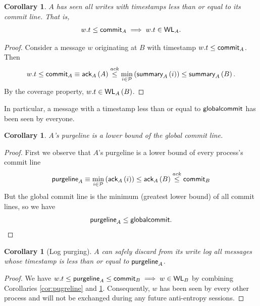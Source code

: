 \documentclass[]             %
{NASA}                       %
\newtheorem{corollary}[theorem]{Corollary}
\theoremstyle{definition}
\begin{document}
\begin{corollary}
  \label{cor:commitline}
  $A$ has seen all writes with timestamps less than or equal to its commit line. That is,
  \[w.t \leq \textsf{commit}_{A} \implies w.t \in \textsf{WL}_{A}.\]
\end{corollary}
\begin{proof}
  Consider a message $w$ originating at $B$ with timestamp $w.t \leq \textsf{commit}_{A}$.
  Then \[w.t \leq  \textsf{commit}_{A} \equiv \textsf{ack}_{A}\left(A\right) \overset{ack}{\leq} \min_{i \in \mathcal{P}}\left(\textsf{summary}_{A}\left(i\right)\right) \leq \textsf{summary}_{A}\left(B\right).\]
  By the coverage property, $w.t \in \textsf{WL}_{A}\left(B\right)$.
\end{proof}

In particular, a message with a timestamp less than or equal to $\textsf{globalcommit}$ has been seen by everyone.

\begin{corollary}
  \label{cor:purgeline}
  $A$'s purgeline is a lower bound of the global commit line.
\end{corollary}
\begin{proof}
  First we observe that $A$'s purgeline is a lower bound of every process's commit line
  \[\textsf{purgeline}_{A} \equiv \min_{i \in \mathcal{P}} \left( \textsf{ack}_{A}\left(i\right) \right) \leq \textsf{ack}_{A}\left(B\right) \overset{ack}{\leq} \textsf{commit}_{B}
  \]
  But the global commit line is the minimum (greatest lower bound) of all commit lines, so we have
  \[ \textsf{purgeline}_{A} \leq \textsf{globalcommit}. \]
\end{proof}

\begin{corollary}[Log purging]
  \label{cor:purge}
  $A$ can safely discard from its write log all messages whose timestamp is less than or equal to $\textsf{purgeline}_{A}$.
\end{corollary}
\begin{proof}
  We have $w.t \leq \textsf{purgeline}_{A} \leq \textsf{commit}_{B} \implies w \in \textsf{WL}_{B}$ by combining Corollaries \ref{cor:pugreline} and \ref{cor:commitline}.
  Consequently, $w$ has been seen by every other process and will not be exchanged during any future anti-entropy sessions.
\end{proof}
\end{document}
